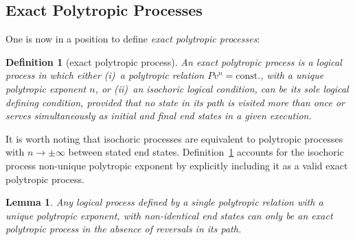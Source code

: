 \documentclass[fleqn,11pt]{SelfArx}
\newtheorem{definition}{Definition}
\newtheorem{lemma}{Lemma}
\begin{document}
    \subsection{Exact Polytropic Processes}\label{sec:exact}

    One is now in a position to define \emph{exact polytropic processes}:

    \begin{definition}[exact polytropic process]\label{def:exact.poly.proc}
        An exact polytropic process is a  logical  process  in  which  either  (i)~a  polytropic
        relation $Pv^n = \mbox{const.}$, with a  unique  polytropic  exponent  $n$,  or  (ii)~an
        isochoric logical condition, can be its sole logical defining condition,  provided  that
        no state in its path is visited more than once or serves simultaneously as  initial  and
        final end states in a given execution.
    \end{definition}

    It is worth noting that isochoric processes are equivalent to polytropic processes  with  $n
    \to \pm\infty$ between stated end states. Definition~\ref{def:exact.poly.proc} accounts  for
    the isochoric process non-unique polytropic exponent by explicitly including it as  a  valid
    exact polytropic process.

    \begin{lemma}\label{lemm:no.reversal}
        Any logical process defined by a single polytropic relation  with  a  unique  polytropic
        exponent, with non-identical end states can only be an exact polytropic process  in  the
        absence of reversals in its path.
    \end{lemma}
\end{document}

